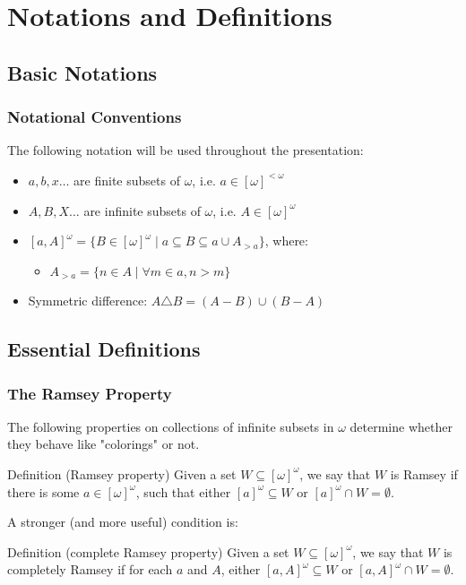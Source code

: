 \documentclass[handout]{beamer}
\begin{document}
\section{Notations and Definitions}

\subsection{Basic Notations}
\begin{frame}
\frametitle{Notational Conventions}
The following notation will be used throughout the presentation: \pause

\begin{itemize}
    \item<2-> $a,b,x\dots$ are finite subsets of $\omega$, i.e. $a\in[\omega]^{<\omega}$
    \item<3-> $A,B,X\dots$ are infinite subsets of $\omega$, i.e. $A\in[\omega]^\omega$
    \item<4-> $[a, A]^\omega = \{B\in[\omega]^\omega\mid a\subseteq B\subseteq a\cup A_{>a}\}$, where\footnotemark: 
    \begin{itemize}
        \item<4-> $A_{>a}=\{n\in A\mid\forall m\in a, n>m\}$
    \end{itemize}
    \item<5-> Symmetric difference: $A\triangle B = (A-B)\cup (B-A)$
\end{itemize}
\end{frame}


\subsection{Essential Definitions}
\begin{frame}
\frametitle{The Ramsey Property}

The following properties on collections of infinite subsets in $\omega$ determine whether they behave like "colorings" or not. \pause
\begin{block}{Definition (Ramsey property)}
Given a set $W\subseteq[\omega]^\omega$, we say that $W$ is \alert{Ramsey} if there is some $a\in[\omega]^\omega$, such that either $[a]^\omega\subseteq W$ or $[a]^\omega\cap W=\emptyset$. 
\end{block}
\pause

A stronger (and more useful) condition is: 
\begin{block}{Definition (complete Ramsey property)}
Given a set $W\subseteq[\omega]^\omega$, we say that $W$ is \alert{completely Ramsey} if for each $a$ and $A$, either $[a,A]^\omega\subseteq W$ or $[a,A]^\omega\cap W=\emptyset$. 
\end{block}
\end{frame}
\end{document}
